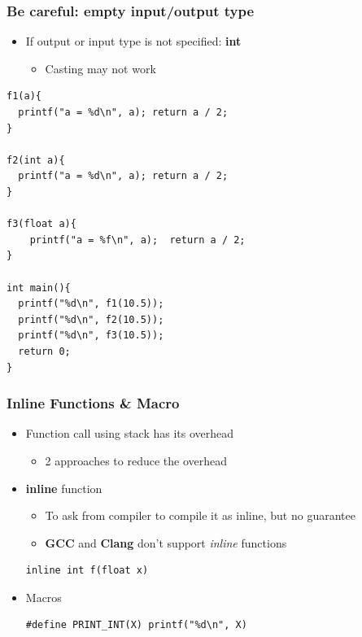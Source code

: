 \documentclass{../c-lecture}
\begin{document}
\begin{frame}[fragile]
  \frametitle{Be careful: empty input/output type}
  \begin{itemize}
    \item
      If output or input type is not specified:
      \textbf{\color{Orange} int}
    \begin{itemize}
      \item Casting may not work
    \end{itemize}
  \end{itemize}
  \scriptsize
  \begin{verbatim}
f1(a){
  printf("a = %d\n", a); return a / 2;
}

f2(int a){
  printf("a = %d\n", a); return a / 2;
}

f3(float a){
    printf("a = %f\n", a);  return a / 2;
}

int main(){
  printf("%d\n", f1(10.5));
  printf("%d\n", f2(10.5));
  printf("%d\n", f3(10.5));
  return 0;
}
  \end{verbatim}
\end{frame}

\begin{frame}[fragile]
  \frametitle{Inline Functions \& Macro}
  \begin{itemize}
    \item Function call using stack has its overhead
    \begin{itemize}
      \item 2 approaches to reduce the overhead
    \end{itemize}
    \item \textbf{\color{Peach}inline} function
    \begin{itemize}
      \item To ask from compiler to compile it as inline, but no guarantee
      \item
        \textbf{GCC} and
        \textbf{Clang} don't support
        \textit{inline} functions
    \end{itemize}
    \begin{verbatim}
inline int f(float x)
    \end{verbatim}
    \item Macros
    \begin{verbatim}
#define PRINT_INT(X) printf("%d\n", X)
    \end{verbatim}
  \end{itemize}
\end{frame}
\end{document}
